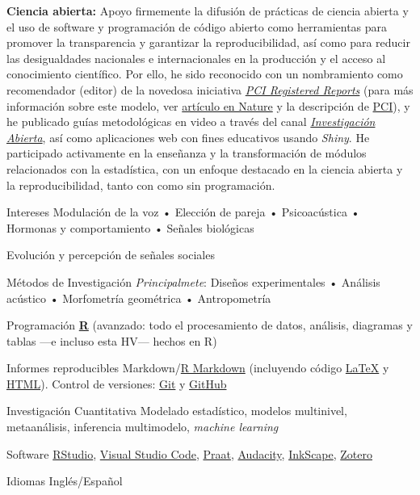 \documentclass[11pt,a4paper,]{awesome-cv}
\begin{document}
\begin{footnotesize}
\textbf{Ciencia abierta:} Apoyo firmemente la difusión de prácticas de ciencia abierta y el uso de software y programación de código abierto como herramientas para promover la transparencia y garantizar la reproducibilidad, así como para reducir las desigualdades nacionales e internacionales en la producción y el acceso al conocimiento científico. Por ello, he sido reconocido con un nombramiento como recomendador (editor) de la novedosa iniciativa \href{https://rr.peercommunityin.org/}{\textit{PCI Registered Reports}} (para más información sobre este modelo, ver \href{https://www.nature.com/articles/d41586-023-03342-6}{artículo en Nature} y la descripción de \href{https://rr.peercommunityin.org/about/about}{PCI}), y he publicado guías metodológicas en video a través del canal \href{https://www.youtube.com/@InvestigacionAbierta}{\textit{Investigación Abierta}}, así como aplicaciones web con fines educativos usando \textit{Shiny}. He participado activamente en la enseñanza y la transformación de módulos relacionados con la estadística, con un enfoque destacado en la ciencia abierta y la reproducibilidad, tanto con como sin programación.

\begin{cvskills}
  \cvskill
    {Intereses}
    {Modulación de la voz • Elección de pareja • Psicoacústica • Hormonas y comportamiento • Señales biológicas}
    
  \cvskill
    {}
    {Evolución y percepción de señales sociales}
    
  \cvskill
    {Métodos de Investigación}
    {\textit{Principalmete}: Diseños experimentales • Análisis acústico • Morfometría geométrica • Antropometría}

  \cvskill
    {Programación}
    {\href{https://www.r-project.org/}{\textbf{R}} (avanzado: todo el procesamiento de datos, análisis, diagramas y tablas —e incluso esta HV— hechos en R)}

  \cvskill
    {Informes reproducibles}
    {Markdown/\href{https://rmarkdown.rstudio.com/}{R Markdown} (incluyendo código  \href{https://www.latex-project.org/}{{\selectfont\LaTeX}} y \href{https://html.spec.whatwg.org/}{HTML}). Control de versiones: \href{https://git-scm.com/}{Git} \faGit* y \href{https://github.com/JDLeongomez}{GitHub} \faGithub}

  \cvskill
    {Investigación Cuantitativa}
    {Modelado estadístico, modelos multinivel, metaanálisis, inferencia multimodelo, \textit{machine learning}}

  \cvskill
    {Software}
    {\href{https://posit.co/products/open-source/rstudio/}{RStudio}, \href{https://code.visualstudio.com/}{Visual Studio Code}, \href{https://www.fon.hum.uva.nl/praat/}{Praat}, \href{https://www.audacityteam.org/}{Audacity}, \href{https://inkscape.org/}{InkScape}, \href{https://www.zotero.org/}{Zotero}}

  \cvskill
    {Idiomas}
    {Inglés/Español}
\end{cvskills}

\end{footnotesize}
\end{document}
